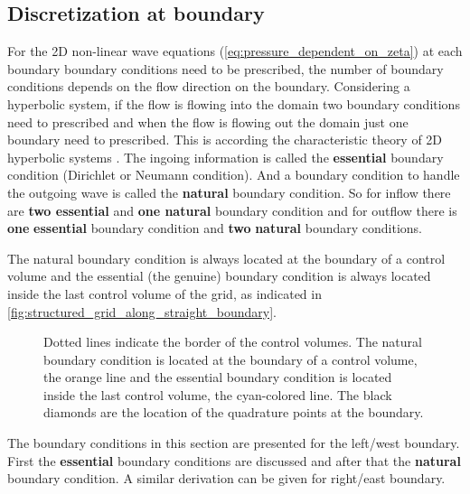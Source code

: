 \subsection{Discretization at boundary}
For the 2D non-linear wave equations (\autoref{eq:pressure_dependent_on_zeta}) at each boundary boundary conditions need to be prescribed, the number of boundary conditions depends on the flow direction on the boundary.
Considering a hyperbolic system, if the flow is flowing into the domain two boundary conditions need to prescribed and when the flow is flowing out the domain just one boundary need to prescribed.
This is according the characteristic theory of 2D hyperbolic systems \citep{DaubertEtGraffe1967}.
The ingoing information is called the \textbf{essential} boundary condition (Dirichlet or Neumann condition).
And a boundary condition to handle the outgoing wave is called the \textbf{natural} boundary condition.
So for inflow there are \textbf{two essential} and \textbf{one natural} boundary condition and for outflow there is \textbf{one} \textbf{essential} boundary condition and \textbf{two} \textbf{natural} boundary conditions.

The natural boundary condition is always located at the boundary of a control volume and the essential (the genuine) boundary condition is always located inside the last control volume of the grid, as indicated in \autoref{fig:structured_grid_along_straight_boundary}.
\begin{figure}[H]
    \begin{center}
        \def\svgwidth{0.80\textwidth} %
        \resizebox{0.65\textwidth}{!}{
            
        }
    \end{center}
    \caption[Definition of the grid to solve the 2D-shallow water equations at the boundary]{Dotted lines indicate the border of the control volumes. The natural boundary condition is located at the boundary of a control volume, the orange line and the essential boundary condition is located inside the last control volume, the cyan-colored line.
    The black diamonds are the location of the quadrature points at the boundary.}
    \label{fig:structured_grid_along_straight_boundary}
\end{figure}

The boundary conditions in this section are presented for the left/west boundary.
First the \textbf{essential} boundary conditions are discussed and after that the \textbf{natural} boundary condition.
A similar derivation can be given for right/east boundary.

